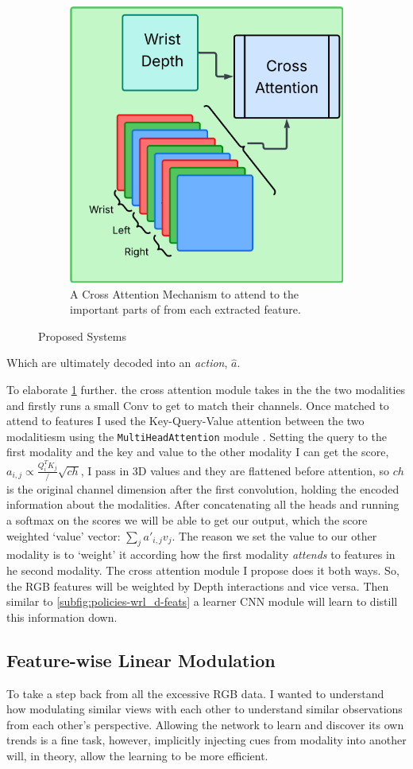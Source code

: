 \begin{figure}[htpb]
\begin{subfigure}{0.45\linewidth}
    \centering
    \includegraphics[width=0.5\linewidth]{assets/cam-comb/policies/wlr_d-attn-diagram.png}
    \caption{A Cross Attention Mechanism to attend to the important parts of from each extracted feature.}\label{subfig:policies-wrl_d-attn}
  \end{subfigure}
  \caption{Proposed Systems}\label{fig:policies-sep-dep-diagrams}
\end{figure}
Which are ultimately decoded into an \emph{action}, $\hat{a}$.

To elaborate \ref{subfig:policies-wrl_d-attn} further. the cross attention module takes in the the two modalities and firstly runs a small Conv to get to match their channels. Once matched to attend to features I used the Key-Query-Value attention \cite{vaswani2023attentionneed} between the two modalitiesm using the \verb|MultiHeadAttention| module \cite{pytorch}. Setting the query to the first modality and the key and value to the other modality I can get the score, \( a_{i, j} \propto \frac{Q_i^TK_j}/\sqrt{ch}\), I pass in 3D values and they are flattened before attention, so $ch$ is the original channel dimension after the first convolution, holding the encoded information about the modalities. After concatenating all the heads and running a softmax on the scores we will be able to get our output, which the score weighted `value' vector: \(\sum_{j}{{a'}_{i, j}v_j}\). The reason we set the value to our other modality is to `weight' it according how the first modality \emph{attends} to features in he second modality. The cross attention module I propose does it both ways. So, the RGB features will be weighted by Depth interactions and vice versa. Then similar to \ref{subfig:policies-wrl_d-feats} a learner CNN module will learn to distill this information down.


\subsection{Feature-wise Linear Modulation}\label{subsec:policies-film}
To take a step back from all the excessive RGB data. I wanted to understand how modulating similar views with each other to understand similar observations from each other's perspective. Allowing the network to learn and discover its own trends is a fine task, however, implicitly injecting cues from modality into another will, in theory, allow the learning to be more efficient.

